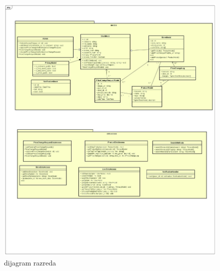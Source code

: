 \begin{figure}[H]
			\includegraphics[width=\textwidth]{slike/dijagramRazreda.png} %
			\caption{dijagram razreda}
			\label{fig:dijagramRazreda} %
			\end{figure}
			
			
			
			
			
